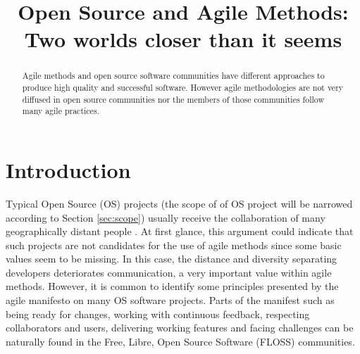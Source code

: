 \documentclass[lnbip]{svmultln}
\begin{document}
\mainmatter

\title{Open Source and Agile Methods:\\Two worlds closer than it
  seems}


\author{}



\institute{}
 
\maketitle

\begin{abstract}
  Agile methods and open source software communities have different
  approaches to produce high quality and successful software. However
  agile methodologies are not very diffused in open source communities
  nor the members of those communities follow many agile
  practices.


\end{abstract}

\section{Introduction}

Typical Open Source (OS) projects (the scope of of OS project will be
narrowed according to Section \ref{sec:scope}) usually receive the
collaboration of many geographically distant people
\cite{report:dempsey1999}. At first glance, this argument could
indicate that such projects are not candidates for the use of agile
methods since some basic values seem to be missing. In this case, the
distance and diversity separating developers deteriorates
communication, a very important value within agile methods. However,
it is common to identify some principles presented by the agile
manifesto \cite{url:agilemanifesto} on many OS software
projects. Parts of the manifest such as being ready for changes,
working with continuous feedback, respecting collaborators and users,
delivering working features and facing challenges can be naturally
found in the Free, Libre, Open Source Software (FLOSS)
communities\cite{gabriel2005}.
\end{document}
